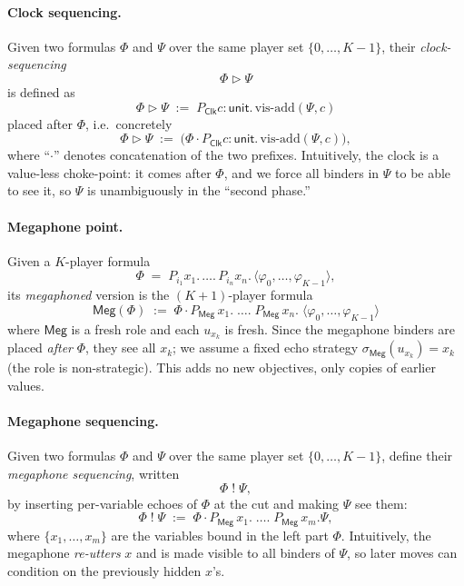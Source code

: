 \paragraph{Clock sequencing.}
Given two formulas $\Phi$ and $\Psi$ over the same player set
$\{0,\dots,K-1\}$, their \emph{clock-sequencing}
\[
  \Phi \triangleright \Psi
\]
is defined as
\[
  \Phi \triangleright \Psi
  \;:=\;
  P_{\mathsf{Clk}} c : \mathsf{unit}.\, \mathrm{vis\text{-}add}(\Psi, c)
\]
placed after $\Phi$, i.e.\ concretely
\[
  \Phi \triangleright \Psi
  \;:=\;
  \bigl(\Phi \cdot P_{\mathsf{Clk}} c : \mathsf{unit}.\, \mathrm{vis\text{-}add}(\Psi, c)\bigr),
\]
where “$\cdot$” denotes concatenation of the two prefixes.
Intuitively, the clock is a value-less choke-point: it comes after
$\Phi$, and we force all binders in $\Psi$ to be able to see it, so
$\Psi$ is unambiguously in the “second phase.”

\paragraph{Megaphone point.}
Given a $K$-player formula
\[
  \Phi \;=\; P_{i_1} x_1.\,\dots.\,P_{i_n} x_n.\,\langle \varphi_0,\dots,\varphi_{K-1}\rangle,
\]
its \emph{megaphoned} version is the $(K{+}1)$-player formula
\[
  \mathsf{Meg}(\Phi)
  \;:=\;
  \Phi \cdot P_{\mathsf{Meg}}\,x_1.\;\dots.\;P_{\mathsf{Meg}}\,x_n.\;\langle \varphi_0,\dots,\varphi_{K-1}\rangle
\]
where $\mathsf{Meg}$ is a fresh role and each $u_{x_k}$ is fresh. Since the
megaphone binders are placed \emph{after} $\Phi$, they see all $x_k$; we assume
a fixed echo strategy $\sigma_{\mathsf{Meg}}(u_{x_k})=x_k$ (the role is
non-strategic). This adds no new objectives, only copies of earlier values.

\paragraph{Megaphone sequencing.}
Given two formulas $\Phi$ and $\Psi$ over the same player set
$\{0,\dots,K{-}1\}$, define their \emph{megaphone sequencing}, written
\[
  \Phi \;!\; \Psi,
\]
by inserting per-variable echoes of $\Phi$ at the cut and making $\Psi$ see
them:
\[
  \Phi \;!\; \Psi
  \;:=\;
  \Phi \cdot
    P_{\mathsf{Meg}}\,x_1.\;\dots.\;P_{\mathsf{Meg}}\,x_m.\Psi,
\]
where $\{x_1,\dots,x_m\}$ are the variables bound in the left part $\Phi$.
Intuitively, the megaphone \emph{re-utters} $x$ and is made visible to all
binders of $\Psi$, so later moves can condition on the previously hidden $x$'s.

